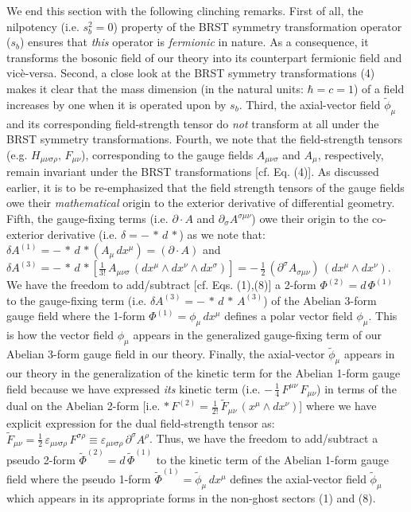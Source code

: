 \documentclass[12pt]{article}
\begin{document}
We end this section with the following clinching remarks. First of all, the nilpotency (i.e. $s_b^2 = 0 $) 
property of the BRST symmetry transformation
operator ($s_b$) ensures that {\it this} operator is {\it fermionic} in nature. As a consequence, it transforms the bosonic field
of our theory into its counterpart fermionic field and vic{\`e}-versa. Second, a close look at the BRST symmetry transformations (4) makes it clear that 
the mass dimension (in the natural units: $\hbar = c = 1 $) of a field increases by one when it is operated upon by $s_b$. 
Third, the axial-vector field $\tilde \phi_\mu$ and its corresponding field-strength tensor
do {\it not} transform at all under the BRST symmetry transformations. Fourth, we note that
the field-strength tensors (e.g. $H_{\mu\nu\sigma\rho}, \, F_{\mu\nu} $), corresponding to the gauge fields $A_{\mu\nu\sigma}$ and $A_\mu$, respectively, 
remain invariant under the BRST transformations [cf. Eq. (4)]. As discussed earlier, it is  to be re-emphasized that 
the field strength tensors of the gauge fields owe their {\it mathematical} origin to the exterior derivative of differential geometry.
Fifth, the gauge-fixing terms (i.e. $\partial \cdot A $ and $\partial_\sigma A^{\sigma\mu\nu} $) owe their origin to the co-exterior derivative
(i.e. $\delta = - \, *\, d\, *$) as we note that: $\delta A^{(1)} = -\, *\, d\, * (A_\mu \, dx^\mu) = (\partial \cdot A) $ and
$\delta A^{(3)} = -\, *\, d\, * [\frac{1}{3!}\, A_{\mu\nu\sigma} \, (dx^\mu \wedge dx^\nu \wedge dx^\sigma)] = - \, \frac{1}{2}\,
(\partial^\sigma  A_{\sigma\mu\nu}) \, (dx^\mu \wedge dx^\nu) $. We have the freedom to add/subtract [cf. Eqs. (1),(8)]
a 2-form $\Phi^{(2)} = d \,\Phi^{(1)}$
to the gauge-fixing term (i.e. $\delta A^{(3)} = -\, *\,d\, *\, A^{(3)} $) of the Abelian 3-form gauge field
where the 1-form $\Phi^{(1)} = \phi_\mu\, dx^\mu $ defines a polar vector field $\phi_\mu$. This is how the vector field $\phi_\mu$ appears in 
the generalized gauge-fixing term of our Abelian 3-form gauge  field in our theory.
Finally, the axial-vector $\widetilde \phi_\mu$ appears in our theory in the generalization of the kinetic term for the Abelian 1-form gauge field
because we have expressed {\it its} kinetic term (i.e. $-\, \frac{1}{4} \, F^{\mu\nu}\, F_{\mu\nu} $) in terms of the
dual on the Abelian 2-form [i.e. $*\, F^{(2)} = \frac{1}{2!}\, \tilde F_{\mu\nu} \, (x^\mu \wedge dx^\nu) $] where we have
explicit expression for the dual field-strength tensor as: $\tilde F_{\mu\nu} = \frac{1}{2}\, \varepsilon_{\mu\nu\sigma\rho}\, F^{\sigma\rho} \equiv
\varepsilon_{\mu\nu\sigma\rho}\, \partial^\sigma A^\rho$. Thus, we have the freedom to add/subtract  a pseudo 2-form
$\widetilde \Phi^{(2)} = d \,\widetilde \Phi^{(1)}$ to the kinetic term of the 
Abelian 1-form gauge field where the pseudo  1-form $\widetilde \Phi^{(1)} = \widetilde \phi_\mu \, dx^\mu$ defines
the axial-vector field $\widetilde \phi_\mu$ which appears in its appropriate forms in the non-ghost sectors (1) and (8).\\
\end{document}
